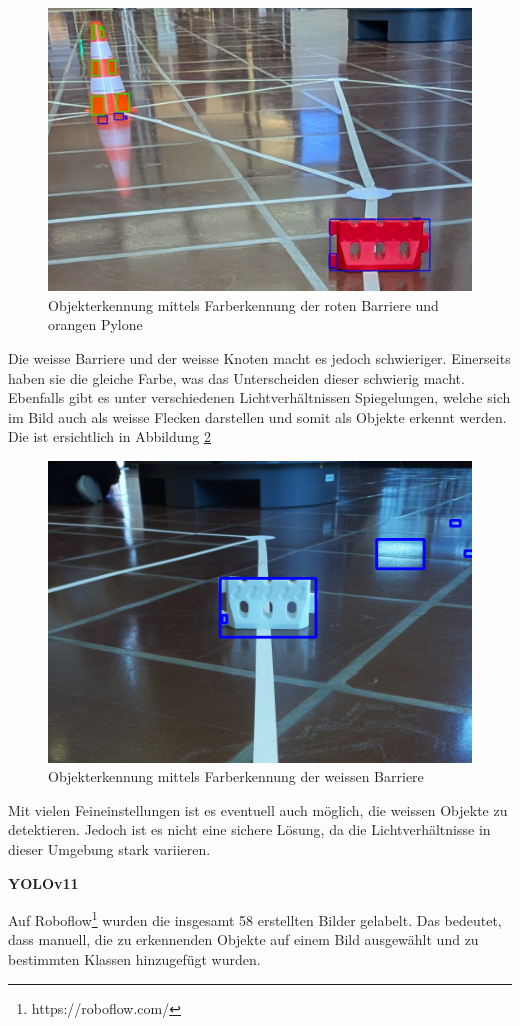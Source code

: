 \begin{figure}[H]
    \centering
    \includegraphics[width=0.5\linewidth]{assets/informatik-prototyp/opencv/object_detection_with_hsv/hsv_object_detection.png}
    \caption{Objekterkennung mittels Farberkennung der roten Barriere und orangen Pylone}
    \label{fig:opencv_hsv_object_detection_good}
\end{figure}


Die weisse Barriere und der weisse Knoten macht es jedoch schwieriger. Einerseits haben sie die gleiche Farbe, was das Unterscheiden dieser schwierig macht. Ebenfalls gibt es unter verschiedenen Lichtverhältnissen Spiegelungen, welche sich im Bild auch als weisse Flecken darstellen und somit als Objekte erkennt werden. Die ist ersichtlich in Abbildung \ref{fig:opencv_hsv_object_detection_bad}

\begin{figure}[H]
    \centering
    \includegraphics[width=0.5\linewidth]{assets/informatik-prototyp/opencv/object_detection_with_hsv/hsv_object_detection_white.png}
    \caption{Objekterkennung mittels Farberkennung der weissen Barriere}
    \label{fig:opencv_hsv_object_detection_bad}
\end{figure}

Mit vielen Feineinstellungen ist es eventuell auch möglich, die weissen Objekte zu detektieren. Jedoch ist es nicht eine sichere Lösung, da die Lichtverhältnisse in dieser Umgebung stark variieren.

\textbf{YOLOv11}

Auf Roboflow\footnote{https://roboflow.com/} wurden die insgesamt 58 erstellten Bilder gelabelt.
Das bedeutet, dass manuell, die zu erkennenden Objekte auf einem Bild ausgewählt und zu bestimmten Klassen hinzugefügt wurden.

